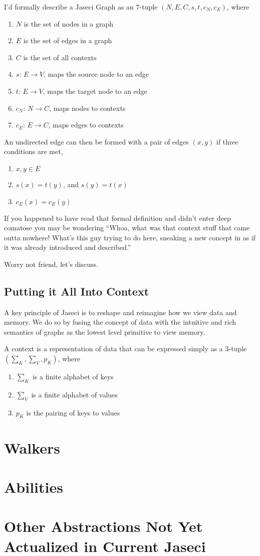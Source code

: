 \begin{nerd}
    I'd formally describe a Jaseci Graph as an $7$-tuple $(N,E,C,s,t,c_N,c_E)$, where
    \begin{enumerate}
        \item $N$ is the set of nodes in a graph
        \item $E$ is the set of edges in a graph
        \item $C$ is the set of all contexts
        \item $s$: $E \rightarrow V$, maps the source node to an edge
        \item $t$: $E \rightarrow V$,  maps the target node to an edge
        \item $c_N$: $N \rightarrow C$, maps nodes to contexts
        \item $c_E$: $E \rightarrow C$, maps edges to contexts
    \end{enumerate}
    An undirected edge can then be formed with a pair of edges $(x, y)$ if three conditions are met,
    \begin{enumerate}
        \item $x, y \in E$
        \item $s(x) = t(y)$, and $s(y) = t(x)$
        \item $c_E(x) = c_E(y)$
    \end{enumerate}
\end{nerd}
\par
If you happened to have read that formal definition and didn't enter deep comatose you may be wondering ``Whoa, what was that context stuff that came outta nowhere! What's this guy trying to do here, sneaking a new concept in as if it was already introduced and described.''
\par
Worry not friend, let's discuss.
\subsection{Putting it All Into Context}

A key principle of Jaseci is to reshape and reimagine how we view data and memory. We do so by fusing the concept of data with the intuitive and rich semantics of graphs as the lowest level primitive to view memory.

\begin{nerd}
    A context is a representation of data that can be expressed simply as a $3$-tuple $(\sum_K,\sum_V,p_K)$, where
    \begin{enumerate}
        \item $\sum_K$ is a finite alphabet of keys
        \item $\sum_V$ is a finite alphabet of values
        \item $p_K$ is the pairing of keys to values
    \end{enumerate}
\end{nerd}
\section{Walkers}
\section{Abilities}
\section{Other Abstractions Not Yet Actualized in Current Jaseci}
